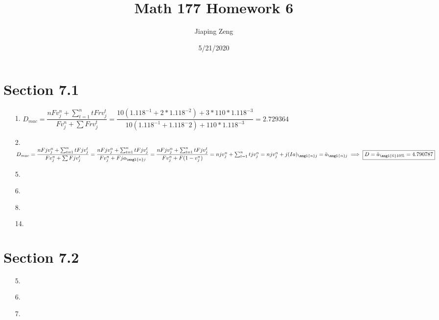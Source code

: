 \documentclass{article}
\title{Math 177 Homework 6}
\date{5/21/2020}
\author{Jiaping Zeng}
\begin{document}
\maketitle

\section*{Section 7.1}
\begin{itemize}
	\item [1.] $D_{mac}=\dfrac{nFv_j^n+\sum_{t=1}^n tFrv_j^t}{Fv_j^n+\sum Frv_j^t}=\dfrac{10(1.118^{-1}+2*1.118^{-2})+3*110*1.118^{-3}}{10(1.118^{-1}+1.118^-2)+110*1.118^{-3}}=\boxed{2.729364}$
	\item [2.] $D_{mac}=\dfrac{nFjv_j^n+\sum_{t=1}^n tFjv_j^t}{Fv_j^n+\sum Fjv_j^t}=\dfrac{nFjv_j^n+\sum_{t=1}^n tFjv_j^t}{Fv_j^n+Fja_{\angl{n}j}}=\dfrac{nFjv_j^n+\sum_{t=1}^n tFjv_j^t}{Fv_j^n+F(1-v_j^n)}=njv_j^n+\sum_{t=1}^n tjv_j^n=njv_j^n+j(Ia)_{\angl{n}j}=\ddot{a}_{\angl{n}j} \implies \boxed{D=\ddot{a}_{\angl{6}10\%}=4.790787}$
	\item [5.] 
	\item [6.] 
	\item [8.]
	\item [14.]
\end{itemize}

\section*{Section 7.2}
\begin{itemize}
	\item [5.]
	\item [6.]
	\item [7.]
\end{itemize}
\end{document}
